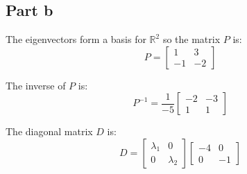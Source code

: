 \subsection{Part b}
The eigenvectors form a basis for $\mathbb{R}^2$ so the matrix $P$ is:
\[
	P = \begin{bmatrix}1 & 3\\-1 & -2\end{bmatrix}
\]

The inverse of $P$ is:
\[
	P^{-1} = \frac{1}{-5}\begin{bmatrix}-2 & -3\\1 & 1\end{bmatrix}
\]

The diagonal matrix $D$ is:
\[
	D = \begin{bmatrix}\lambda_1 & 0\\0 & \lambda_2\end{bmatrix}\begin{bmatrix}-4 & 0\\0 & -1\end{bmatrix}
\]
